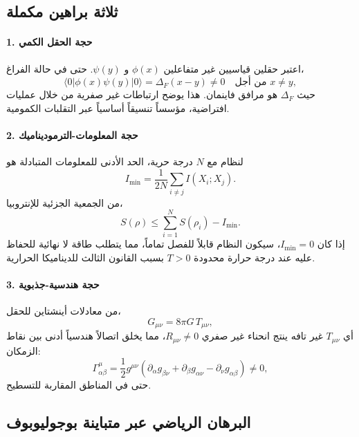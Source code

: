 \documentclass[11pt,a4paper]{article}
\begin{document}
	\subsection{ثلاثة براهين مكملة}
	
	\paragraph*{1. حجة الحقل الكمي}
	اعتبر حقلين قياسيين غير متفاعلين $\phi(x)$ و $\psi(y)$. حتى في حالة الفراغ،
	\[
	\langle 0 | \phi(x) \psi(y) | 0 \rangle = \Delta_F(x-y) \neq 0 \quad \text{من أجل } x \neq y,
	\]
	حيث $\Delta_F$ هو مرافق فاينمان. هذا يوضح ارتباطات غير صفرية من خلال عمليات افتراضية، مؤسساً تنسيقاً أساسياً عبر التقلبات الكمومية.
	
	\paragraph*{2. حجة المعلومات-الترموديناميك}
	لنظام مع $N$ درجة حرية، الحد الأدنى للمعلومات المتبادلة هو
	\[
	I_{\min} = \frac{1}{2N} \sum_{i \neq j} I(X_i; X_j).
	\]
	من الجمعية الجزئية للإنتروبيا،
	\[
	S(\rho) \leq \sum_{i=1}^N S(\rho_i) - I_{\min}.
	\]
	إذا كان $I_{\min}=0$، سيكون النظام قابلاً للفصل تماماً، مما يتطلب طاقة لا نهائية للحفاظ عليه عند درجة حرارة محدودة $T>0$ بسبب القانون الثالث للديناميكا الحرارية.
	
	\paragraph*{3. حجة هندسية-جذبوية}
	من معادلات أينشتاين للحقل،
	\[
	G_{\mu\nu} = 8\pi G \, T_{\mu\nu},
	\]
	أي $T_{\mu\nu}$ غير تافه ينتج انحناء غير صفري $R_{\mu\nu} \neq 0$، مما يخلق اتصالاً هندسياً أدنى بين نقاط الزمكان:
	\[
	\Gamma^{\mu}_{\alpha\beta} = \frac{1}{2} g^{\mu\nu}(\partial_\alpha g_{\beta\nu} + \partial_\beta g_{\alpha\nu} - \partial_\nu g_{\alpha\beta}) \neq 0,
	\]
	حتى في المناطق المقاربة للتسطيح.
	
	\subsection{البرهان الرياضي عبر متباينة بوجوليوبوف}
	
\end{document}
